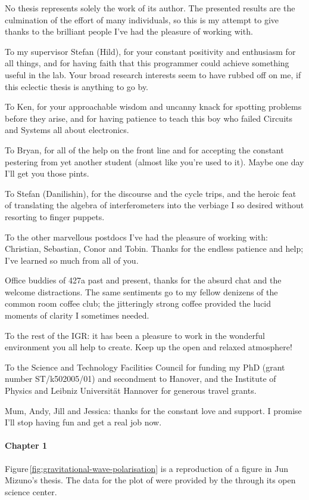 No thesis represents solely the work of its author. The presented results are the culmination of the effort of many individuals, so this is my attempt to give thanks to the brilliant people I've had the pleasure of working with.

\bigskip

To my supervisor Stefan (Hild), for your constant positivity and enthusiasm for all things, and for having faith that this programmer could achieve something useful in the lab. Your broad research interests seem to have rubbed off on me, if this eclectic thesis is anything to go by.

To Ken, for your approachable wisdom and uncanny knack for spotting problems before they arise, and for having patience to teach this boy who failed Circuits and Systems all about electronics.

To Bryan, for all of the help on the front line and for accepting the constant pestering from yet another student (almost like you're used to it). Maybe one day I'll get you those pints.

To Stefan (Danilishin), for the discourse and the cycle trips, and the heroic feat of translating the algebra of interferometers into the verbiage I so desired without resorting to finger puppets.

To the other marvellous postdocs I've had the pleasure of working with: Christian, Sebastian, Conor and Tobin. Thanks for the endless patience and help; I've learned so much from all of you.

Office buddies of 427a past and present, thanks for the absurd chat and the welcome distractions. The same sentiments go to my fellow denizens of the common room coffee club; the jitteringly strong coffee provided the lucid moments of clarity I sometimes needed.

To the rest of the IGR: it has been a pleasure to work in the wonderful environment you all help to create. Keep up the open and relaxed atmosphere!

To the Science and Technology Facilities Council for funding my PhD (grant number ST/k502005/01) and secondment to Hanover, and the Institute of Physics and Leibniz Universit\"{a}t Hannover for generous travel grants.

Mum, Andy, Jill and Jessica: thanks for the constant love and support. I promise I'll stop having fun and get a real job now.

\paragraph{Chapter 1}
Figure\,\ref{fig:gravitational-wave-polarisation} is a reproduction of a figure in Jun Mizuno's thesis. The data for the plot of \GWFIRSTEVENT{} were provided by the \LSC{} through its open science center.

